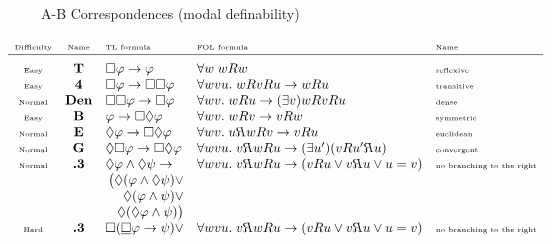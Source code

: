 \documentclass[xcolor=x11names]{beamer}
\newcommand{\lthen}{\rightarrow}
\newcommand{\existsp}[1]{(\exists #1)}
\begin{document}


\begin{frame}
\vspace{-.2cm}
\begin{center}A-B Correspondences (modal definability)\end{center}
\vspace{-.2cm}
\scriptsize
\[\hspace{-.9cm}\begin{array}{cclll}
\rotatebox{0}{\textup{\tiny Difficulty}} & \textup{\tiny Name} & \textup{\tiny TL formula} & \textup{\tiny FOL formula} &\textup{\tiny Name}
\\ \hline
\\[-.7em]  \textup{\tiny Easy}& \textbf {T} & \Box \varphi \lthen \varphi & \forall w \; wRw &\textup{\tiny reflexive}
\\ \textup{\tiny Easy}& \textbf {4} & \Box \varphi \lthen \Box\Box\varphi & \forall {wvu}.\; wRvRu\lthen wRu &\textup{\tiny transitive}
\\ \textup{\tiny Normal}& \textbf {Den} & \Box \Box \varphi \lthen \Box \varphi &\forall {wv} . \; wRu\lthen \existsp v wRvRu &\textup{\tiny dense}
\\ \textup{\tiny Easy}& \textbf {B} & \varphi \lthen \Box \Diamond\varphi &\forall {wv} .\;wRv\lthen vRw &\textup{\tiny symmetric}
\\ \textup{\tiny Normal}& \textbf {E} & \Diamond \varphi \lthen \Box \Diamond\varphi &\forall {wv} .\;u\reflectbox{$R$}wRv\lthen vRu &\textup{\tiny euclidean}
\\ \textup{\tiny Normal}& \textbf {G} & \Diamond \Box \varphi \lthen \Box \Diamond\varphi &\forall {wvu}.\;v\reflectbox {$R$}wRu\lthen  \existsp{u'} (vRu'\reflectbox {$R$}u) &\textup{\tiny convergent}
\\ \textup{\tiny Normal}& \textbf {.3} & \Diamond \varphi \land \Diamond \psi \lthen &\forall {wvu}.\;v\reflectbox {$R$}wRu\lthen (vRu \lor v\reflectbox {$R$}u \lor u=v) &\textup{\tiny no branching to the right}
\\ && \hfill \big(\Diamond (\varphi \land \Diamond\psi) \lor
\\ && \hfill \Diamond (\varphi \land \psi) \lor
\\ && \hfill \Diamond (\Diamond \varphi \land \psi)\big)
\\ \textup{\tiny Hard}& \textbf {.3} & \Box (\underline{\Box} \varphi \lthen \psi)\lor &\forall {wvu}.\;v\reflectbox {$R$}wRu\lthen (vRu \lor v\reflectbox {$R$}u \lor u=v) &\textup{\tiny no branching to the right}

\end{array}\]
\end{frame}
\end{document}
